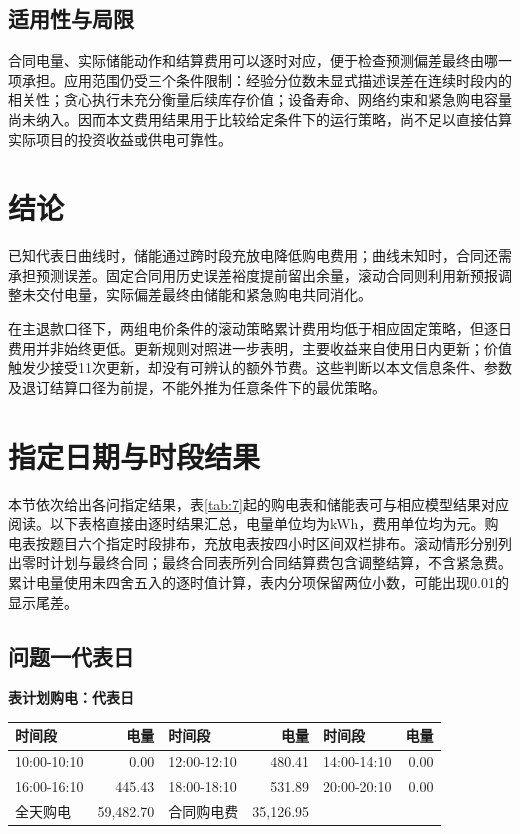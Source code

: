 \documentclass[12pt,a4paper]{ctexart}
\newcommand{\papertable}[1]{\refstepcounter{table}\label{tab:\thetable}\textbf{表\thetable\quad #1}}
\begin{document}
\subsection{适用性与局限}
合同电量、实际储能动作和结算费用可以逐时对应，便于检查预测偏差最终由哪一项承担。应用范围仍受三个条件限制：经验分位数未显式描述误差在连续时段内的相关性；贪心执行未充分衡量后续库存价值；设备寿命、网络约束和紧急购电容量尚未纳入。因而本文费用结果用于比较给定条件下的运行策略，尚不足以直接估算实际项目的投资收益或供电可靠性。

\section{结论}
已知代表日曲线时，储能通过跨时段充放电降低购电费用；曲线未知时，合同还需承担预测误差。固定合同用历史误差裕度提前留出余量，滚动合同则利用新预报调整未交付电量，实际偏差最终由储能和紧急购电共同消化。

在主退款口径下，两组电价条件的滚动策略累计费用均低于相应固定策略，但逐日费用并非始终更低。更新规则对照进一步表明，主要收益来自使用日内更新；价值触发少接受11次更新，却没有可辨认的额外节费。这些判断以本文信息条件、参数及退订结算口径为前提，不能外推为任意条件下的最优策略。

\section{指定日期与时段结果}
本节依次给出各问指定结果，表\ref{tab:7}起的购电表和储能表可与相应模型结果对应阅读。以下表格直接由逐时结果汇总，电量单位均为kWh，费用单位均为元。购电表按题目六个指定时段排布，充放电表按四小时区间双栏排布。滚动情形分别列出零时计划与最终合同；最终合同表所列合同结算费包含调整结算，不含紧急费。累计电量使用未四舍五入的逐时值计算，表内分项保留两位小数，可能出现0.01的显示尾差。

\subsection{问题一代表日}


\par\addvspace{5pt}\noindent\begin{minipage}{\linewidth}\centering
\small
\papertable{计划购电：代表日}\par\vspace{4pt}
\begin{tabular}{lrlrlr}
\toprule
时间段 & 电量 & 时间段 & 电量 & 时间段 & 电量 \\
\midrule
10:00-10:10 & 0.00 & 12:00-12:10 & 480.41 & 14:00-14:10 & 0.00 \\
16:00-16:10 & 445.43 & 18:00-18:10 & 531.89 & 20:00-20:10 & 0.00 \\
全天购电 & 59,482.70 & 合同购电费 & 35,126.95 &  &  \\
\bottomrule
\end{tabular}
\end{minipage}\par\addvspace{5pt}
\end{document}
